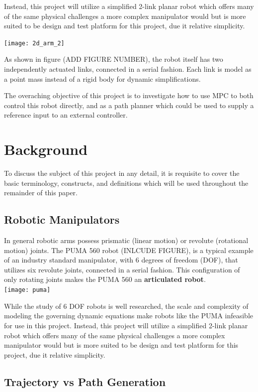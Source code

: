 \documentclass[journal]{IEEEtran}
\begin{document}
Instead, this project will utilize a simplified 2-link planar robot which offers many of the same physical challenges a more complex manipulator would but is more suited to be design and test platform for this project, due it relative simplicity.


\texttt{[image: 2d\_arm\_2]}


As shown in figure (ADD FIGURE NUMBER), the robot itself has two independently actuated links, connected in a serial fashion. Each link is model as a point mass instead of a rigid body for dynamic simplifications.

The overaching objective of this project is to investigate how to use MPC to both control this robot directly, and as a path planner which could be used to supply a reference input to an external controller.




\section{Background}
To discuss the subject of this project in any detail, it is requisite to cover the basic terminology, constructs, and definitions which will be used throughout the remainder of this paper.

\subsection{Robotic Manipulators}

In general robotic arms possess prismatic (linear motion) or revolute (rotational motion) joints. The PUMA 560 robot (INLCUDE FIGURE), is a typical example of an industry standard manipulator, with 6 degrees of freedom (DOF), that utilizes six revolute joints, connected in a serial fashion. This configuration of only rotating joints makes the PUMA 560 an \textbf{articulated robot}. \\

\texttt{[image: puma]}

While the study of 6 DOF robots is well researched, the scale and complexity of modeling the governing dynamic equations make robots like the PUMA infeasible for use in this project. Instead, this project will utilize a simplified 2-link planar robot which offers many of the same physical challenges a more complex manipulator would but is more suited to be design and test platform for this project, due it relative simplicity.

\subsection{Trajectory vs Path Generation}
\end{document}
